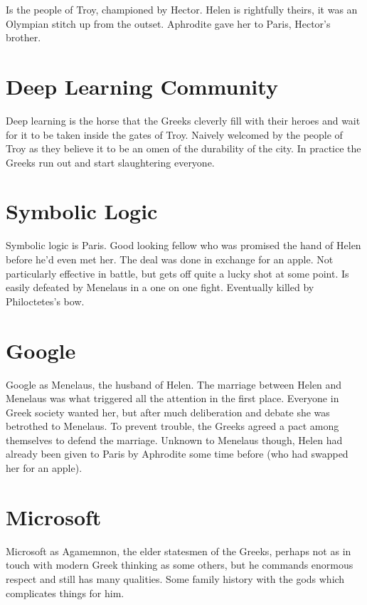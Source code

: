 \documentclass[a4paper]{caesar_book}
\begin{document}
Is the people of Troy, championed by Hector. Helen is rightfully theirs, it was an Olympian stitch up from the outset. Aphrodite gave her to Paris, Hector’s brother.

\section{Deep Learning Community}

Deep learning is the horse that the Greeks cleverly fill with their heroes and wait for it to be taken inside the gates of Troy. Naively welcomed by the people of Troy as they believe it to be an omen of the durability of the city. In practice the Greeks run out and start slaughtering everyone.

\section{Symbolic Logic}

Symbolic logic is Paris. Good looking fellow who was promised the hand of Helen before he’d even met her. The deal was done in exchange for an apple. Not particularly effective in battle, but gets off quite a lucky shot at some point. Is easily defeated by Menelaus in a one on one fight. Eventually killed by Philoctetes’s bow.

\section{Google}

Google as Menelaus, the husband of Helen. The marriage between Helen and Menelaus was what triggered all the attention in the first place. Everyone in Greek society wanted her, but after much deliberation and debate she was betrothed to Menelaus. To prevent trouble, the Greeks agreed a pact among themselves to defend the marriage. Unknown to Menelaus though, Helen had already been given to Paris by Aphrodite some time before (who had swapped her for an apple).

\section{Microsoft}

Microsoft as Agamemnon, the elder statesmen of the Greeks, perhaps not as in touch with modern Greek thinking as some others, but he commands enormous respect and still has many qualities. Some family history with the gods which complicates things for him.
\end{document}
